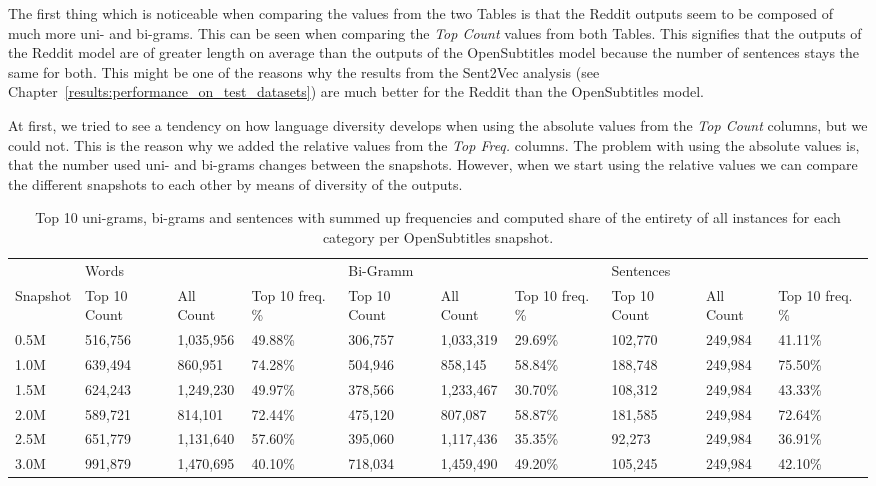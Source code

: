 The first thing which is noticeable when comparing the values from the two Tables is that the Reddit outputs seem to be composed of much more uni- and bi-grams. This can be seen when comparing the \emph{Top Count} values from both Tables. This signifies that the outputs of the Reddit model are of greater length on average than the outputs of the OpenSubtitles model because the number of sentences stays the same for both. This might be one of the reasons why the results from the Sent2Vec analysis (see Chapter~\ref{results:performance_on_test_datasets}) are much better for the Reddit than the OpenSubtitles model.

At first, we tried to see a tendency on how language diversity develops when using the absolute values from the \emph{Top Count} columns, but we could not. This is the reason why we added the relative values from the \emph{Top Freq.} columns. The problem with using the absolute values is, that the number used uni- and bi-grams changes between the snapshots. However, when we start using the relative values we can compare the different snapshots to each other by means of diversity of the outputs. 

\begin{table}[H]
	\centering
	\begin{adjustbox}{max width=\textwidth}
		\begin{tabular}{llllllllll}
			\toprule
			& Words &&&Bi-Gramm&&&Sentences&&\\
			Snapshot & Top 10 Count & All Count& Top 10 freq. \%&  Top 10 Count& All Count& Top 10 freq. \%&  Top 10 Count& All Count& Top 10 freq. \%\\
			\midrule
			0.5M & 516,756	 & 1,035,956	& 49.88\%	&306,757	&1,033,319	&29.69\%	&102,770	&249,984	&41.11\%\\
			1.0M & 639,494	 & 860,951		& 74.28\%	&504,946	&858,145	&58.84\%	&188,748	&249,984	&75.50\%\\
			1.5M & 624,243	 & 1,249,230	& 49.97\%	&378,566	&1,233,467	&30.70\%	&108,312	&249,984	&43.33\%\\
			2.0M & 589,721	 & 814,101		& 72.44\%	&475,120	&807,087	&58.87\%	&181,585	&249,984	&72.64\%\\
			2.5M & 651,779	 & 1,131,640	& 57.60\%	&395,060	&1,117,436	&35.35\%	&92,273		&249,984	&36.91\%\\
			3.0M & 991,879	 & 1,470,695	& 40.10\%	&718,034	&1,459,490	&49.20\%	&105,245	&249,984	&42.10\%\\
			\bottomrule
		\end{tabular}
	\end{adjustbox}
	\caption{Top 10 uni-grams, bi-grams and sentences with summed up frequencies and computed share of the entirety of all instances for each category per OpenSubtitles snapshot.}
	\label{results:top_10_frequency:OpenSubtitles}
\end{table}


